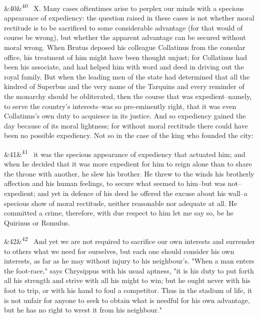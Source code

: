 \documentclass[12pt]{article}
\newcommand{\para}[1][]{\par\noindent\ifx&#1&\else\textsuperscript{\footnotesize #1}~\fi}
\begin{document}
\para[40] X. Many cases oftentimes arise to perplex our minds with a specious appearance of expediency: the question raised in these cases is not whether moral rectitude is to be sacrificed to some considerable advantage (for that would of course be wrong), but whether the apparent advantage can be secured without moral wrong. When Brutus deposed his colleague Collatinus from the consular office, his treatment of him might have been thought unjust; for Collatinus had been his associate, and had helped him with word and deed in driving out the royal family. But when the leading men of the state had determined that all the kindred of Superbus and the very name of the Tarquins and every reminder of the monarchy should be obliterated, then the course that was expedient--namely, to serve the country's interests--was so pre-eminently right, that it was even Collatinus's own duty to acquiesce in its justice. And so expediency gained the day because of its moral lightness; for without moral rectitude there could have been no possible expediency. Not so in the case of the king who founded the city:

\para[41] it was the specious appearance of expediency that actuated him; and when he decided that it was more expedient for him to reign alone than to share the throne with another, he slew his brother. He threw to the winds his brotherly affection and his human feelings, to secure what seemed to him--but was not--expedient; and yet in defence of his deed he offered the excuse about his wall--a specious show of moral rectitude, neither reasonable nor adequate at all. He committed a crime, therefore, with due respect to him let me say so, be he Quirinus or Romulus.

\para[42] And yet we are not required to sacrifice our own interests and surrender to others what we need for ourselves, but each one should consider his own interests, as far as he may without injury to his neighbour's. "When a man enters the foot-race," says Chrysippus with his usual aptness, "it is his duty to put forth all his strength and strive with all his might to win; but he ought never with his foot to trip, or with his hand to foul a competitor. Thus in the stadium of life, it is not unfair for anyone to seek to obtain what is needful for his own advantage, but he has no right to wrest it from his neighbour."
\end{document}
